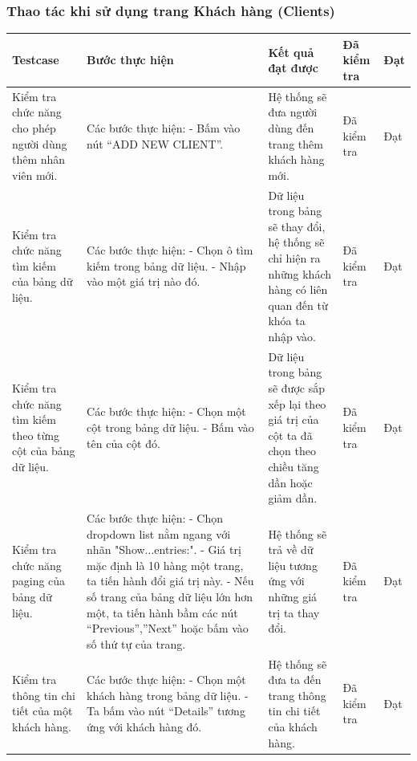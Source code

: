\documentclass{article}
\begin{document}
\subsubsection{Thao tác khi sử dụng trang Khách hàng (Clients)  }
\begin{longtable}{ | p{} |p{} | p{}  | p{}  | p{}  | } 
\hline
\textbf{Testcase}& \textbf{Bước thực hiện}& \textbf{Kết quả đạt được} & \textbf{Đã kiểm tra}& \textbf{Đạt} \\ 
\hline
\hline
Kiểm tra chức năng cho phép người dùng thêm nhân viên mới. &
Các bước thực hiện: \newline
- Bấm vào nút “ADD NEW CLIENT”.
&
Hệ thống sẽ đưa người dùng đến trang thêm khách hàng mới. &
Đã kiểm tra &
Đạt \\

\hline
Kiểm tra chức năng tìm kiếm của bảng dữ liệu. &
Các bước thực hiện: \newline
- Chọn ô tìm kiếm trong bảng dữ liệu. \newline
- Nhập vào một giá trị nào đó.
&
Dữ liệu trong bảng sẽ thay đổi, hệ thống sẽ chỉ hiện ra những khách hàng có liên quan đến từ khóa ta nhập vào. &
Đã kiểm tra &
Đạt \\

\hline
Kiểm tra chức năng tìm kiếm theo từng cột của bảng dữ liệu. &
Các bước thực hiện: \newline
- Chọn một cột trong bảng dữ liệu. \newline
- Bấm vào tên của cột đó. 
&
Dữ liệu trong bảng sẽ được sắp xếp lại theo giá trị của cột ta đã chọn theo chiều tăng dần hoặc giảm dần. &
Đã kiểm tra &
Đạt \\

\hline
Kiểm tra chức năng paging của bảng dữ liệu. &
Các bước thực hiện: \newline
- Chọn dropdown list nằm ngang với nhãn "Show...entries:". \newline
- Giá trị mặc định là 10 hàng một trang, ta tiến hành đổi giá trị này. \newline
- Nếu số trang của bảng dữ liệu lớn hơn một, ta tiến hành bầm các nút “Previous”,”Next” hoặc bấm vào số thứ tự của trang.
&
Hệ thống sẽ trả về dữ liệu tương ứng với những giá trị ta thay đổi. &
Đã kiểm tra &
Đạt \\

\hline
Kiểm tra thông tin chi tiết của một khách hàng. &
Các bước thực hiện: \newline
- Chọn một khách hàng trong bảng dữ liệu. \newline
- Ta bấm vào nút “Details” tương ứng với khách hàng đó. 
&
Hệ thống sẽ đưa ta đến trang thông tin chi tiết của khách hàng. &
Đã kiểm tra &
Đạt \\


\end{longtable}
\end{document}
